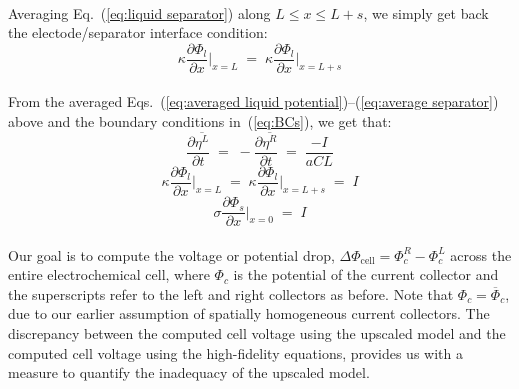\\
Averaging Eq.~(\ref{eq:liquid separator}) along $L \le x \le L+s$, we simply get back the electode/separator interface condition:
\begin{equation}
\kappa \frac{\partial \Phi_l}{\partial x}\bigg|_{x = L}\;  =\;\kappa \frac{\partial \Phi_l}{\partial x}\bigg|_{x = L+s}
\label{eq:average separator}
\end{equation}
\\
From the averaged Eqs.~(\ref{eq:averaged liquid potential})--(\ref{eq:average separator}) above and the boundary conditions in~(\ref{eq:BCs}), we get that:
\begin{equation}
\frac{\partial \overline {\eta^{L}}}{\partial t} \;=\; -\frac{\partial \overline {\eta^{R}}}{\partial t}\; =\; \frac{-I}{aCL} 
\end{equation}
\begin{equation}
\kappa \frac{\partial \Phi_l}{\partial x}\bigg|_{x = L} \;=\; \kappa \frac{\partial \Phi_l}{\partial x}\bigg|_{x = L+s}\; =\; I 
\end{equation}
\begin{equation}
\sigma \frac{\partial \Phi_s}{\partial x}\bigg|_{x=0} \;=\; I 
\end{equation}
\\
Our goal is to compute the voltage or potential drop, $\Delta \Phi_\text{cell} = \Phi_c^R - \Phi_c^L$ across the entire electrochemical cell, where $\Phi_c$ is the potential of the current collector and the superscripts refer to the left and right collectors as before. Note that $\Phi_c = \overline \Phi_c$, due to our earlier assumption of spatially homogeneous current collectors. The discrepancy between the computed cell voltage using the upscaled model and the computed cell voltage using the high-fidelity equations, provides us with a measure to quantify the inadequacy of the upscaled model.

